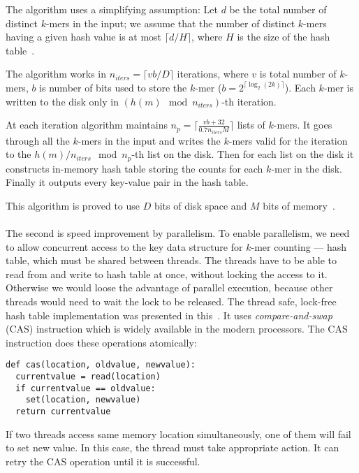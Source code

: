 The algorithm uses a simplifying assumption: Let $d$ be the total number of distinct $k$-mers in the input; we assume that the number of distinct $k$-mers having a given hash value is at most $\lceil d/H \rceil$, where $H$ is the size of the hash table~\cite{dsk}.

The algorithm works in $n_{iters} = \lceil vb/D\rceil$ iterations, where $v$ is total number of $k$-mers, $b$ is number of bits used to store the $k$-mer ($b = 2^{\lceil\log_2(2k)\rceil}$). Each $k$-mer is written to the disk only in $(h(m) \mod n_{iters})$-th iteration.

At each iteration algorithm maintains $n_p = \lceil\frac{vb+32}{0.7n_{iters}M}\rceil$ lists of $k$-mers.
It goes through all the $k$-mers in the input and writes the $k$-mers valid for the iteration to the $h(m)/n_{iters} \mod n_p$-th list on the disk.
Then for each list on the disk it constructs in-memory hash table storing the counts for each $k$-mer in the disk.
Finally it outputs every key-value pair in the hash table.

This algorithm is proved to use $D$ bits of disk space and $M$ bits of memory~\cite{dsk}.

\paragraph{} The second is speed improvement by parallelism. To enable parallelism, we need to allow concurrent access to the key data structure for $k$-mer counting --- hash table, which must be shared between threads. The threads have to be able to read from and write to hash table at once, without locking the access to it. Otherwise we would loose the advantage of parallel execution, because other threads would need to wait the lock to be released. The thread safe, lock-free hash table implementation was presented in this~\cite{jellyfish}. It uses \emph{compare-and-swap} (CAS) instruction which is widely available in the modern processors. The CAS instruction does these operations atomically:
\begin{lstlisting}
def cas(location, oldvalue, newvalue):
  currentvalue = read(location)
  if currentvalue == oldvalue:
    set(location, newvalue)
  return currentvalue
\end{lstlisting}
If two threads access same memory location simultaneously, one of them will fail to set new value. In this case, the thread must take appropriate action.
It can retry the CAS operation until it is successful.

